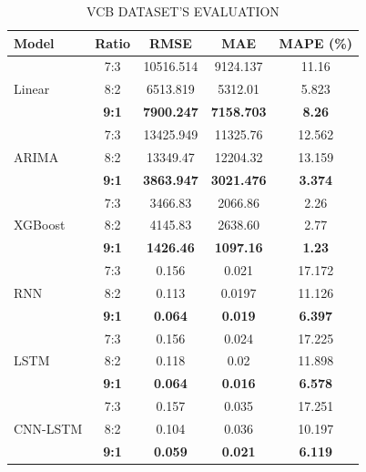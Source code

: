 \documentclass[conference]{IEEEtran}
\begin{document}
\begin{table}[h]
\centering
\caption{VCB DATASET’S EVALUATION}
\begin{tabular}{lcccc}
\toprule
\textbf{Model} & \textbf{Ratio} & \textbf{RMSE} & \textbf{MAE} & \textbf{MAPE (\%)} \\ \midrule
\multirow{3}{*}{Linear} & 7:3 & 10516.514 & 9124.137 & 11.16 \\
                        & 8:2 & 6513.819 & 5312.01 & 5.823 \\
                        & \textbf{9:1} & \textbf{7900.247} & \textbf{7158.703} & \textbf{8.26} \\ \midrule
\multirow{3}{*}{ARIMA} & 7:3 & 13425.949 & 11325.76 & 12.562 \\
                        & 8:2 & 13349.47 & 12204.32 & 13.159 \\
                        & \textbf{9:1} & \textbf{3863.947} & \textbf{3021.476} & \textbf{3.374} \\ \midrule
\multirow{3}{*}{XGBoost} & 7:3 & 3466.83 & 2066.86 & 2.26 \\
                        & 8:2 & 4145.83 & 2638.60 & 2.77 \\
                        & \textbf{9:1} & \textbf{1426.46} & \textbf{1097.16} & \textbf{1.23} \\ \midrule
\multirow{3}{*}{RNN} & 7:3 & 0.156 & 0.021 & 17.172 \\
                        & 8:2 & 0.113 & 0.0197 & 11.126 \\
                        & \textbf{9:1} & \textbf{0.064} & \textbf{0.019} & \textbf{6.397} \\ \midrule
\multirow{3}{*}{LSTM} & 7:3 & 0.156 & 0.024 & 17.225 \\
                        & 8:2 & 0.118 & 0.02 & 11.898 \\
                        & \textbf{9:1} & \textbf{0.064} & \textbf{0.016} & \textbf{6.578} \\ \midrule
\multirow{3}{*}{CNN-LSTM} & 7:3 & 0.157 & 0.035 & 17.251 \\
                        & 8:2 & 0.104 & 0.036 & 10.197 \\
                        & \textbf{9:1} & \textbf{0.059} & \textbf{0.021} & \textbf{6.119} \\ \bottomrule
\end{tabular}
\end{table}
\end{document}
